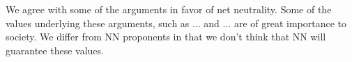 We agree with some of the arguments in favor of net neutrality. Some of the values underlying these arguments, such as ... and ... are of great importance to society. We differ from NN proponents in that we don't think that NN will guarantee these values.
